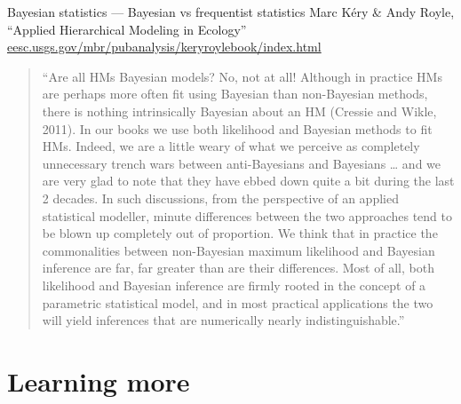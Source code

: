 \documentclass[
  ignorenonframetext,
  aspectratio=169,
  t]{beamer}
\begin{document}
\begin{frame}{Bayesian statistics --- Bayesian vs frequentist
statistics}
\protect{}\label{bayesian-statistics-bayesian-vs-frequentist-statistics-1}
Marc Kéry \& Andy Royle, ``Applied Hierarchical Modeling in Ecology''\\
\href{https://eesc.usgs.gov/mbr/pubanalysis/keryroylebook/index.html}{eesc.usgs.gov/mbr/pubanalysis/keryroylebook/index.html}

\vspace{1em}

\begin{quote}
\footnotesize ``Are all HMs Bayesian models? No, not at all! Although in
practice HMs are perhaps more often fit using Bayesian than non-Bayesian
methods, there is nothing intrinsically Bayesian about an HM (Cressie
and Wikle, 2011). In our books we use both likelihood and Bayesian
methods to fit HMs. Indeed, we are a little weary of what we perceive as
completely unnecessary trench wars between anti-Bayesians and Bayesians
\ldots{} and we are very glad to note that they have ebbed down quite a
bit during the last 2 decades. In such discussions, from the perspective
of an applied statistical modeller, minute differences between the two
approaches tend to be blown up completely out of proportion. We think
that in practice the commonalities between non-Bayesian maximum
likelihood and Bayesian inference are far, far greater than are their
differences. Most of all, both likelihood and Bayesian inference are
firmly rooted in the concept of a parametric statistical model, and in
most practical applications the two will yield inferences that are
numerically nearly indistinguishable.''
\end{quote}
\end{frame}

\section{Learning more}\label{learning-more}
\end{document}
